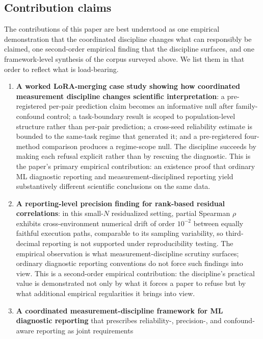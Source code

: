 \documentclass[10pt]{article}
\begin{document}
\subsection{Contribution claims}

The contributions of this paper are best understood as one
empirical demonstration that the coordinated discipline changes
what can responsibly be claimed, one second-order empirical
finding that the discipline surfaces, and one framework-level
synthesis of the corpus surveyed above. We list them in that
order to reflect what is load-bearing.

\begin{enumerate}
  \item \textbf{A worked LoRA-merging case study showing how
    coordinated measurement discipline changes scientific
    interpretation}: a pre-registered per-pair prediction claim
    becomes an informative null after family-confound control; a
    task-boundary result is scoped to population-level structure
    rather than per-pair prediction; a cross-seed reliability
    estimate is bounded to the same-task regime that generated it;
    and a pre-registered four-method comparison produces a
    regime-scope null. The discipline succeeds by making each
    refusal explicit rather than by rescuing the diagnostic. This
    is the paper's primary empirical contribution: an existence
    proof that ordinary ML diagnostic reporting and
    measurement-disciplined reporting yield substantively different
    scientific conclusions on the same data.
  \item \textbf{A reporting-level precision finding for rank-based
    residual correlations}: in this small-$N$ residualized
    setting, partial Spearman $\rho$ exhibits cross-environment
    numerical drift of order $10^{-2}$ between equally faithful
    execution paths, comparable to its sampling variability, so
    third-decimal reporting is not supported under reproducibility
    testing. The empirical observation is what
    measurement-discipline scrutiny surfaces; ordinary diagnostic
    reporting conventions do not force such findings into view.
    This is a second-order empirical contribution: the discipline's
    practical value is demonstrated not only by what it forces a
    paper to refuse but by what additional empirical regularities
    it brings into view.
  \item \textbf{A coordinated measurement-discipline framework for
    ML diagnostic reporting} that prescribes reliability-,
    precision-, and confound-aware reporting as joint requirements

\end{enumerate}
\end{document}
